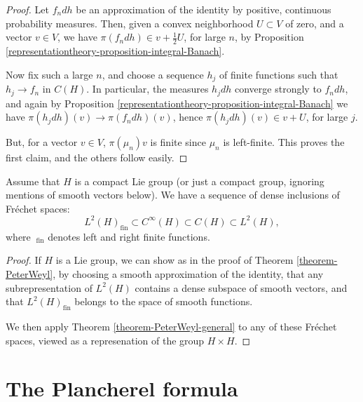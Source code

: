 \begin{proof}
Let $f_n dh$ be an approximation of the identity by positive, continuous probability measures. Then, given a convex neighborhood $U\subset V$ of zero, and a vector $v\in V$, we have $\pi(f_n dh)\in v+\frac{1}{2}U$, for large $n$, by Proposition \ref{representationtheory-proposition-integral-Banach}. 

Now fix such a large $n$, and choose a sequence $h_j$ of finite functions such that $h_j\to f_n$ in $C(H)$. In particular, the measures $h_j dh$ converge strongly to $f_n dh$, and again by Proposition \ref{representationtheory-proposition-integral-Banach} we have $\pi(h_j dh)(v)\to \pi(f_n dh)(v)$, hence $\pi(h_j dh)(v)\in v+U$, for large $j$. 


But, for a vector $v\in V$, $\pi(\mu_n)v$ is finite since $\mu_n$ is left-finite. This proves the first claim, and the others follow easily.

\end{proof}




\begin{proposition}
\label{proposition-denseinclusions} 
Assume that $H$ is a compact Lie group (or just a compact group, ignoring mentions of smooth vectors below). We have a sequence of dense inclusions of Fr\'echet spaces:
\begin{equation}
 L^2(H)_{\text{fin}} \subset C^\infty(H) \subset C(H)\subset L^2(H),
\end{equation}
where $~_{\text{fin}}$ denotes left and right finite functions.
\end{proposition}

\begin{proof}
If $H$ is a Lie group, we can show as in the proof of Theorem \ref{theorem-PeterWeyl}, by choosing a smooth approximation of the identity, that any subrepresentation of $L^2(H)$ contains a dense subspace of smooth vectors, and that $L^2(H)_{\text{fin}}$ belongs to the space of smooth functions. 


We then apply Theorem \ref{theorem-PeterWeyl-general} to any of these Fr\'echet spaces, viewed as a represenation of the group $H\times H$. 


 
\end{proof}



\section{The Plancherel formula}
\label{section-Plancherel}

